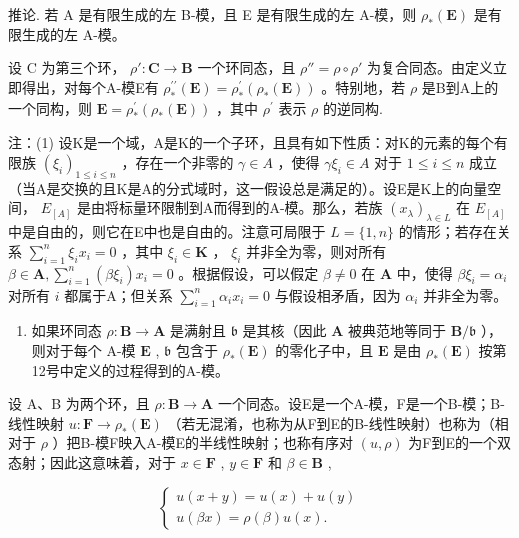 推论. 若 A 是有限生成的左 B-模，且 E 是有限生成的左 A-模，则 \(\rho_{*}(\mathbf{E})\) 是有限生成的左 A-模。

设 C 为第三个环， \(\rho':\mathbf{C}\to\mathbf{B}\) 一个环同态，且 \(\rho''=\rho\circ\rho'\) 为复合同态。由定义立即得出，对每个A-模E有 \(\rho_{*}^{\prime \prime}(\mathbf{E}) = \rho_{*}^{\prime}(\rho_{*}(\mathbf{E}))\) 。特别地，若 \(\rho\) 是B到A上的一个同构，则 \(\mathbf{E} = \rho_{*}^{\prime}(\rho_{*}(\mathbf{E}))\) ，其中 \(\rho^{\prime}\) 表示 \(\rho\) 的逆同构.

注：(1) 设K是一个域，A是K的一个子环，且具有如下性质：对K的元素的每个有限族 \((\xi_{i})_{1\leqslant i\leqslant n}\) ，存在一个非零的 \(\gamma\in A\) ，使得 \(\gamma\xi_{i}\in A\) 对于 \(1\leqslant i\leqslant n\) 成立（当A是交换的且K是A的分式域时，这一假设总是满足的）。设E是K上的向量空间， \(E_{[A]}\) 是由将标量环限制到A而得到的A-模。那么，若族 \((x_{\lambda})_{\lambda\in L}\) 在 \(E_{[A]}\) 中是自由的，则它在E中也是自由的。注意可局限于 \(L=\{1,n\}\) 的情形；若存在关系 \(\sum_{i=1}^{n} \xi_i x_i = 0\) ，其中 \(\xi_i \in \mathbf{K}\) ， \(\xi_i\) 并非全为零，则对所有 \(\beta \in \mathbf{A}, \sum_{i=1}^{n} (\beta \xi_i) x_i = 0\) 。根据假设，可以假定 \(\beta \neq 0\) 在 \(\mathbf{A}\) 中，使得 \(\beta \xi_{i} = \alpha_{i}\) 对所有 \(i\) 都属于A；但关系 \(\sum_{i=1}^{n} \alpha_{i} x_{i} = 0\) 与假设相矛盾，因为 \(\alpha_{i}\) 并非全为零。

\begin{enumerate}
\def\labelenumi{(\arabic{enumi})}
\setcounter{enumi}{1}
\tightlist
\item
  如果环同态 \(\rho: \mathbf{B} \to \mathbf{A}\) 是满射且 \(\mathfrak{b}\) 是其核（因此 \(\mathbf{A}\) 被典范地等同于 \(\mathbf{B} / \mathfrak{b}\) ），则对于每个 A-模 \(\mathbf{E}\) , \(\mathfrak{b}\) 包含于 \(\rho_*(\mathbf{E})\) 的零化子中，且 \(\mathbf{E}\) 是由 \(\rho_*(\mathbf{E})\) 按第12号中定义的过程得到的A-模。
\end{enumerate}

设 A、B 为两个环，且 \(\rho: \mathbf{B} \to \mathbf{A}\) 一个同态。设E是一个A-模，F是一个B-模；B-线性映射 \(u: \mathbf{F} \to \rho_{*}(\mathbf{E})\) （若无混淆，也称为从F到E的B-线性映射）也称为（相对于 \(\rho\) ）把B-模F映入A-模E的半线性映射；也称有序对 \((u, \rho)\) 为F到E的一个双态射；因此这意味着，对于 \(x \in \mathbf{F}\) , \(y \in \mathbf{F}\) 和 \(\beta \in \mathbf{B}\) ,

\[
\left\{ \begin{array}{l} u (x + y) = u (x) + u (y) \\ u (\beta x) = \rho (\beta) u (x). \end{array} \right.\tag{48}
\]

